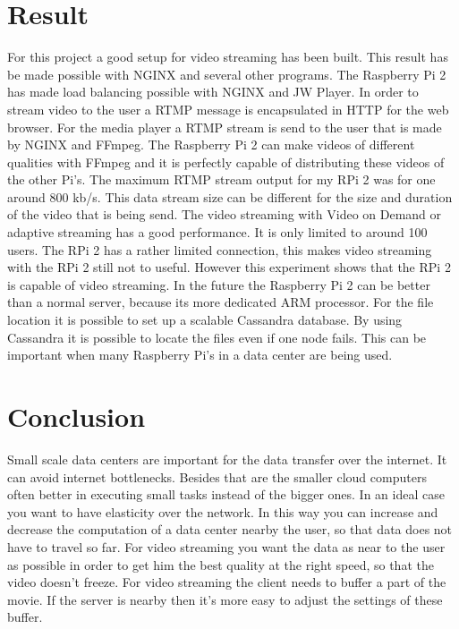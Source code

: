 \documentclass{sig-alternate-br}
\begin{document}
\section{Result}

For this project a good setup for video streaming has been built. This result has be made possible with NGINX and several other programs. The Raspberry Pi 2 has made load balancing possible with NGINX and JW Player. In order to stream video to the user a RTMP message is encapsulated in HTTP for the web browser.  For the media player a RTMP stream is send to the user that is made by NGINX and FFmpeg.\newline
The Raspberry Pi 2 can make videos of different qualities with FFmpeg and it is perfectly capable of distributing these videos of the other Pi's.  The maximum RTMP stream output for my RPi 2 was for one around 800 kb/s. This data stream size can be different for the size and duration of the video that is being send. \newline
The video streaming with Video on Demand or adaptive streaming has a good performance. It is only limited to around 100 users. The RPi 2 has a rather limited connection, this makes video streaming with the RPi 2 still not to useful. However this experiment shows that the RPi 2 is capable of video streaming. In the future the Raspberry Pi 2 can be better than a normal server, because its more dedicated ARM processor. \newline
For the file location it is possible to set up a scalable Cassandra database. By using Cassandra it is possible to locate the files even if one node fails. This can be important when many Raspberry Pi's in a data center are being used. 
  

\section{Conclusion}
Small scale data centers are important for the data transfer over the internet. It can avoid internet bottlenecks. Besides that are the smaller cloud computers often better in executing small tasks instead of the bigger ones.  In an ideal case you want to have elasticity over the network. In this way you can increase and decrease the computation of a data center nearby the user, so that data does not have to travel so far. For video streaming you want the data as near to the user as possible in order to get him the best quality at the right speed, so that the video doesn't freeze. For video streaming the client needs to buffer a part of the movie. If the server is nearby then it's more easy to adjust the settings of these buffer. 
\end{document}

